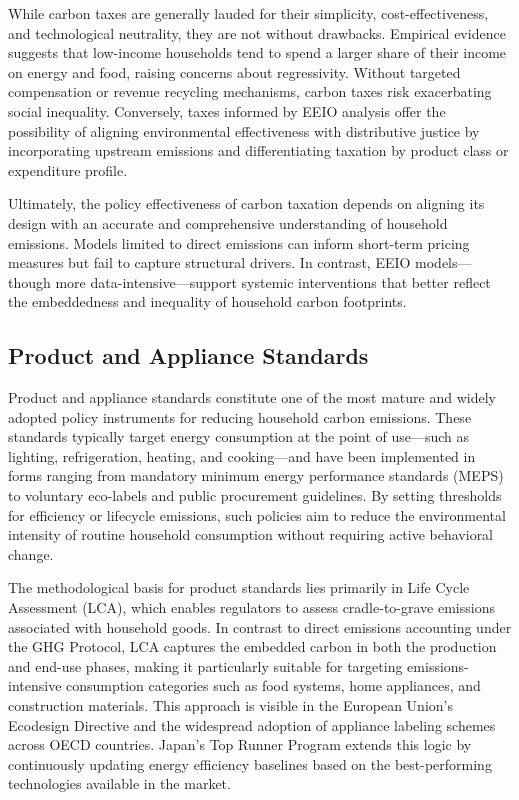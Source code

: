 \documentclass[12pt,a4paper]{article}%
\begin{document}
While carbon taxes are generally lauded for their simplicity, cost-effectiveness, and technological neutrality, they are not without drawbacks. Empirical evidence suggests that low-income households tend to spend a larger share of their income on energy and food, raising concerns about regressivity. Without targeted compensation or revenue recycling mechanisms, carbon taxes risk exacerbating social inequality. Conversely, taxes informed by EEIO analysis offer the possibility of aligning environmental effectiveness with distributive justice by incorporating upstream emissions and differentiating taxation by product class or expenditure profile.

Ultimately, the policy effectiveness of carbon taxation depends on aligning its design with an accurate and comprehensive understanding of household emissions. Models limited to direct emissions can inform short-term pricing measures but fail to capture structural drivers. In contrast, EEIO models—though more data-intensive—support systemic interventions that better reflect the embeddedness and inequality of household carbon footprints.

\subsection{Product and Appliance Standards}

Product and appliance standards constitute one of the most mature and widely adopted policy instruments for reducing household carbon emissions. These standards typically target energy consumption at the point of use—such as lighting, refrigeration, heating, and cooking—and have been implemented in forms ranging from mandatory minimum energy performance standards (MEPS) to voluntary eco-labels and public procurement guidelines. By setting thresholds for efficiency or lifecycle emissions, such policies aim to reduce the environmental intensity of routine household consumption without requiring active behavioral change.

The methodological basis for product standards lies primarily in Life Cycle Assessment (LCA), which enables regulators to assess cradle-to-grave emissions associated with household goods. In contrast to direct emissions accounting under the GHG Protocol, LCA captures the embedded carbon in both the production and end-use phases, making it particularly suitable for targeting emissions-intensive consumption categories such as food systems, home appliances, and construction materials. This approach is visible in the European Union’s Ecodesign Directive and the widespread adoption of appliance labeling schemes across OECD countries. Japan’s Top Runner Program extends this logic by continuously updating energy efficiency baselines based on the best-performing technologies available in the market.
\end{document}
